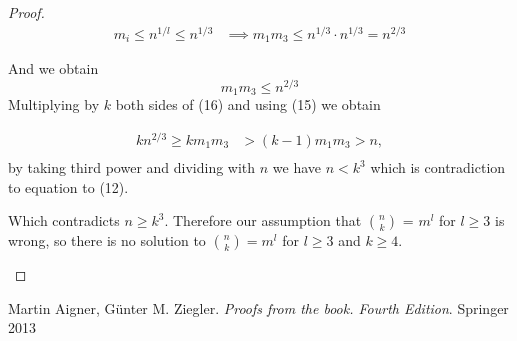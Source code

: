 \documentclass[a4paper]{article}
\begin{document}
\begin{proof}
\begin{align*}
m_i \leq n^{1/l} \leq n^{1/3}  
&\implies m_1 m_3 \leq n^{1/3}\cdot n^{1/3} = n^{2/3}
\end{align*}

And we obtain
\begin{equation}
m_1 m_3 \leq n^{2/3}
\end{equation}
Multiplying by $k$ both sides of (16) and using (15) we obtain

\begin{align*}
kn^{2/3} \geq km_1 m_3 &> (k-1)m_1 m_3 > n, \\
\end{align*}
by taking third power and dividing  with $n$ we have $n<k^3$ which is contradiction to equation to (12).
\begin{flushleft}
Which contradicts $n \geq k^3$. Therefore our assumption that $n \choose k$ = $m^l$ for $l \geq3 $ is wrong, so there is no solution to ${n\choose k}=m^l$ for $l\geq 3$ and $k\geq 4$.
\end{flushleft}  
  
\end{proof}

\begin{thebibliography}{9}
 Martin Aigner, Günter M. Ziegler.   
\textit{Proofs from the book. Fourth Edition}. 
 Springer 2013
\end{thebibliography}
\end{document}
